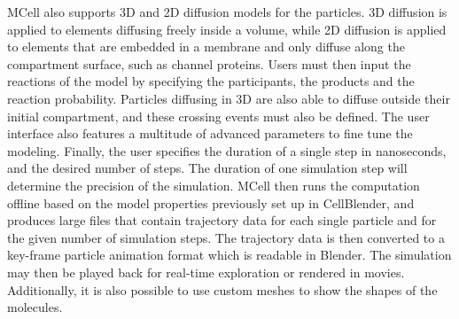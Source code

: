 MCell also supports 3D and 2D diffusion models for the particles.
3D diffusion is applied to elements diffusing freely inside a volume, while 2D diffusion is applied to elements that are embedded in a membrane and only diffuse along the compartment surface, such as channel proteins.
Users must then input the reactions of the model by specifying the participants, the products and the reaction probability.
Particles diffusing in 3D are also able to diffuse outside their initial compartment, and these crossing events must also be defined.
The user interface also features a multitude of advanced parameters to fine tune the modeling.
Finally, the user specifies the duration of a single step in nanoseconds, and the desired number of steps. 
The duration of one simulation step will determine the precision of the simulation.
MCell then runs the computation offline based on the model properties previously set up in CellBlender, and produces large files that contain trajectory data for each single particle and for the given number of simulation steps.
The trajectory data is then converted to a key-frame particle animation format which is readable in Blender.
The simulation may then be played back for real-time exploration or rendered in movies.
Additionally, it is also possible to use custom meshes to show the shapes of the molecules.

